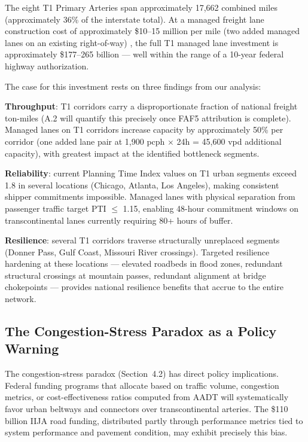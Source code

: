 The eight T1 Primary Arteries span approximately 17,662 combined miles (approximately 36\% of the interstate total). At a managed freight lane construction cost of approximately \$10--15 million per mile (two added managed lanes on an existing right-of-way) \citep{FHWA_CostStudy}, the full T1 managed lane investment is approximately \$177--265 billion --- well within the range of a 10-year federal highway authorization.

The case for this investment rests on three findings from our analysis:

\textbf{Throughput}: T1 corridors carry a disproportionate fraction of national freight ton-miles (A.2 will quantify this precisely once FAF5 attribution is complete). Managed lanes on T1 corridors increase capacity by approximately 50\% per corridor (one added lane pair at 1,900 pcph $\times$ 24h = 45,600 vpd additional capacity), with greatest impact at the identified bottleneck segments.

\textbf{Reliability}: current Planning Time Index values on T1 urban segments exceed 1.8 in several locations (Chicago, Atlanta, Los Angeles), making consistent shipper commitments impossible. Managed lanes with physical separation from passenger traffic target PTI $\leq$ 1.15, enabling 48-hour commitment windows on transcontinental lanes currently requiring 80+ hours of buffer.

\textbf{Resilience}: several T1 corridors traverse structurally unreplaced segments (Donner Pass, Gulf Coast, Missouri River crossings). Targeted resilience hardening at these locations --- elevated roadbeds in flood zones, redundant structural crossings at mountain passes, redundant alignment at bridge chokepoints --- provides national resilience benefits that accrue to the entire network.

\subsection{The Congestion-Stress Paradox as a Policy Warning}

The congestion-stress paradox (Section~4.2) has direct policy implications. Federal funding programs that allocate based on traffic volume, congestion metrics, or cost-effectiveness ratios computed from AADT will systematically favor urban beltways and connectors over transcontinental arteries. The \$110 billion IIJA road funding, distributed partly through performance metrics tied to system performance and pavement condition, may exhibit precisely this bias.

